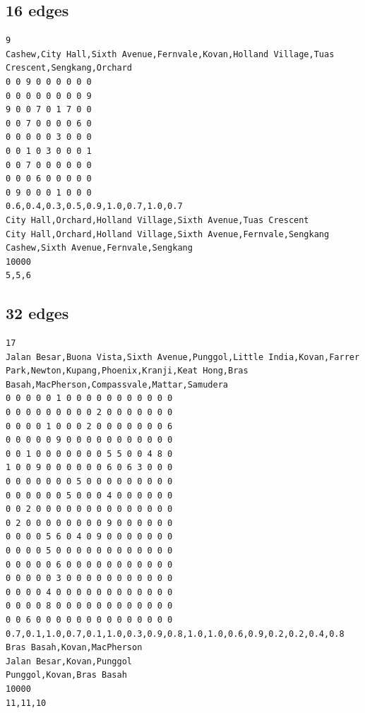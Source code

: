 \documentclass[a4paper,12pt]{article}
\begin{document}
\subsection*{16 edges}
\begin{verbatim}
9
Cashew,City Hall,Sixth Avenue,Fernvale,Kovan,Holland Village,Tuas Crescent,Sengkang,Orchard
0 0 9 0 0 0 0 0 0
0 0 0 0 0 0 0 0 9
9 0 0 7 0 1 7 0 0
0 0 7 0 0 0 0 6 0
0 0 0 0 0 3 0 0 0
0 0 1 0 3 0 0 0 1
0 0 7 0 0 0 0 0 0
0 0 0 6 0 0 0 0 0
0 9 0 0 0 1 0 0 0
0.6,0.4,0.3,0.5,0.9,1.0,0.7,1.0,0.7
City Hall,Orchard,Holland Village,Sixth Avenue,Tuas Crescent
City Hall,Orchard,Holland Village,Sixth Avenue,Fernvale,Sengkang
Cashew,Sixth Avenue,Fernvale,Sengkang
10000
5,5,6
\end{verbatim}
\subsection*{32 edges}
\begin{verbatim}
17
Jalan Besar,Buona Vista,Sixth Avenue,Punggol,Little India,Kovan,Farrer Park,Newton,Kupang,Phoenix,Kranji,Keat Hong,Bras Basah,MacPherson,Compassvale,Mattar,Samudera
0 0 0 0 0 1 0 0 0 0 0 0 0 0 0 0 0
0 0 0 0 0 0 0 0 0 2 0 0 0 0 0 0 0
0 0 0 0 1 0 0 0 2 0 0 0 0 0 0 0 6
0 0 0 0 0 9 0 0 0 0 0 0 0 0 0 0 0
0 0 1 0 0 0 0 0 0 0 5 5 0 0 4 8 0
1 0 0 9 0 0 0 0 0 0 6 0 6 3 0 0 0
0 0 0 0 0 0 0 5 0 0 0 0 0 0 0 0 0
0 0 0 0 0 0 5 0 0 0 4 0 0 0 0 0 0
0 0 2 0 0 0 0 0 0 0 0 0 0 0 0 0 0
0 2 0 0 0 0 0 0 0 0 9 0 0 0 0 0 0
0 0 0 0 5 6 0 4 0 9 0 0 0 0 0 0 0
0 0 0 0 5 0 0 0 0 0 0 0 0 0 0 0 0
0 0 0 0 0 6 0 0 0 0 0 0 0 0 0 0 0
0 0 0 0 0 3 0 0 0 0 0 0 0 0 0 0 0
0 0 0 0 4 0 0 0 0 0 0 0 0 0 0 0 0
0 0 0 0 8 0 0 0 0 0 0 0 0 0 0 0 0
0 0 6 0 0 0 0 0 0 0 0 0 0 0 0 0 0
0.7,0.1,1.0,0.7,0.1,1.0,0.3,0.9,0.8,1.0,1.0,0.6,0.9,0.2,0.2,0.4,0.8
Bras Basah,Kovan,MacPherson
Jalan Besar,Kovan,Punggol
Punggol,Kovan,Bras Basah
10000
11,11,10
\end{verbatim}
\end{document}
